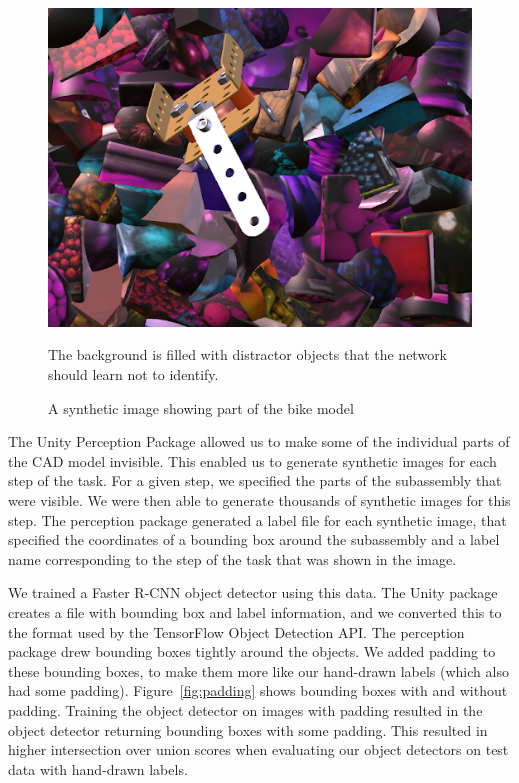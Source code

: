 \begin{figure}
  \includegraphics[width=\columnwidth]{figures/synthetic/perception_default.png}
  \begin{captiontext}
    The background is filled with distractor objects that the network should
    learn not to identify.
  \end{captiontext}
  \caption{
    A synthetic image showing part of the bike model
  }\label{fig:perception_default}
\end{figure}

The Unity Perception Package allowed us to make some of the individual parts of
the CAD model invisible.
This enabled us to generate synthetic images for each step of the task.
For a given step, we specified the parts of the subassembly that were visible.
We were then able to generate thousands of synthetic images for this step.
The perception package generated a label file for each synthetic image, that
specified the coordinates of a bounding box around the subassembly and a label
name corresponding to the step of the task that was shown in the image.

We trained a Faster R-CNN object detector using this data.
The Unity package creates a file with bounding box and label information, and
we converted this to the format used by the TensorFlow Object Detection API.
The perception package drew bounding boxes tightly around the objects.
We added padding to these bounding boxes, to make them more like our hand-drawn
labels (which also had some padding).
Figure~\ref{fig:padding} shows bounding boxes with and without padding.
Training the object detector on images with padding resulted in the object
detector returning bounding boxes with some padding.
This resulted in higher intersection over union scores when evaluating our
object detectors on test data with hand-drawn labels.

